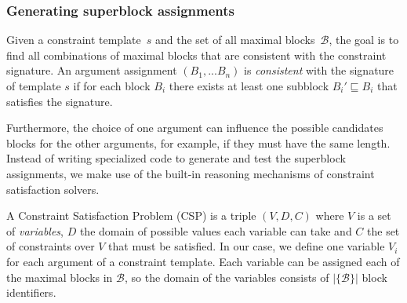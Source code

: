 \documentclass{IEEEtran}
\newcommand{\format}[1]{\textit{#1}\xspace}
\newcommand{\template}{\format{constraint template}}
\newcommand{\CSignature}{Signature\xspace}
\newcommand{\groups}{\ensuremath{\mathcal{B}}\xspace}
\newcommand{\blocks}{\ensuremath{\mathcal{B}}\xspace}
\theoremstyle{definition}
\begin{document}
\subsubsection{Generating superblock assignments}

Given a constraint template~$s$ and the set of all maximal blocks~\blocks, the goal is to find all combinations of maximal blocks that are consistent with the constraint signature.
An argument assignment $(B_1, ... B_n)$ is \textit{consistent} with the signature of template $s$ if for each block $B_i$ there exists at least one subblock $B_i' \sqsubseteq B_i$ that satisfies the signature.

Furthermore, the choice of one argument can influence the possible candidates blocks for the other arguments, for example, if they must have the same length.
Instead of writing specialized code to generate and test the superblock assignments, we make use of the built-in reasoning mechanisms of constraint satisfaction solvers.

A Constraint Satisfaction Problem (CSP) is a triple $(V,D,C)$ where $V$ is a set of \textit{variables}, $D$ the domain of possible values each variable can take and $C$ the set of constraints over $V$ that must be satisfied.
In our case, we define one variable $V_i$ for each argument of a constraint template.
Each variable can be assigned each of the maximal blocks in \blocks, so the domain of the variables consists of $|\{\blocks\}|$ block identifiers.

\end{document}
